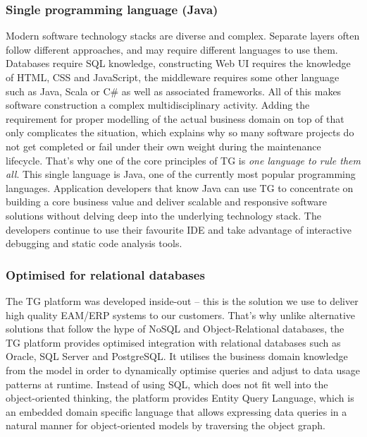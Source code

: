 \documentclass[a4paper,10pt,twocolumn,oneside,openright,final]{memoir}
\begin{document}
\subsubsection*{Single programming language (Java)}
	Modern software technology stacks are diverse and complex.
	Separate layers often follow different approaches, and may require different languages to use them.
	Databases require SQL knowledge, constructing Web UI requires the knowledge of HTML, CSS and JavaScript, the middleware requires some other language such as Java, Scala or C\# as well as associated frameworks.
	All of this makes software construction a complex multidisciplinary activity.
	Adding the requirement for proper modelling of the actual business domain on top of that only complicates the situation, which explains why so many software projects do not get completed or fail under their own weight during the maintenance lifecycle.
	That's why one of the core principles of TG is \emph{one language to rule them all}.
	This single language is Java, one of the currently most popular programming languages.
	Application developers that know Java can use TG to concentrate on building a core business value and deliver scalable and responsive software solutions without delving deep into the underlying technology stack.
	The developers continue to use their favourite IDE and take advantage of interactive debugging and static code analysis tools.

\subsubsection*{Optimised for relational databases}
	The TG platform was developed inside-out -- this is the solution we use to deliver high quality EAM/ERP systems to our customers.
	That's why unlike alternative solutions that follow the hype of NoSQL and Object-Relational databases, the TG platform provides optimised integration with relational databases such as Oracle, SQL Server and PostgreSQL.
	It utilises the business domain knowledge from the model in order to dynamically optimise queries and adjust to data usage patterns at runtime.
	Instead of using SQL, which does not fit well into the object-oriented thinking, the platform provides Entity Query Language, which is an embedded domain specific language that allows expressing data queries in a natural manner for object-oriented models by traversing the object graph.
\end{document}
